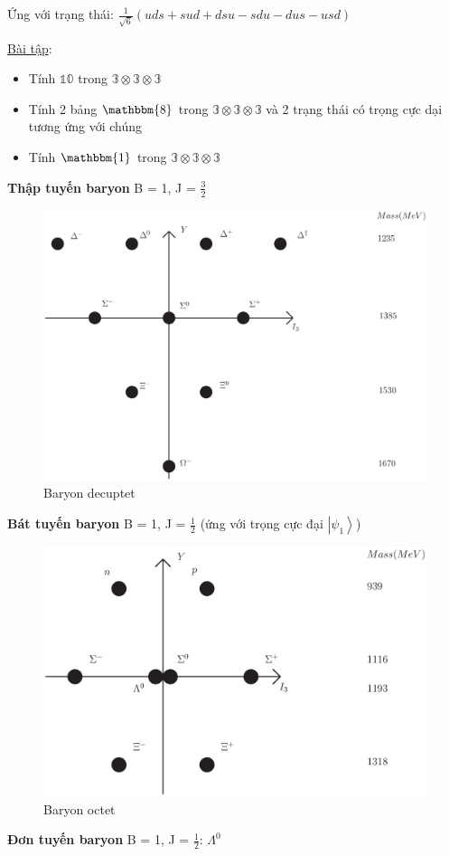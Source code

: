 \documentclass{report}
\begin{document}
Ứng với trạng thái: \(  \frac{1}{\sqrt{6}} \left( uds + sud + dsu - sdu - dus - usd \right) \)

\underline{Bài tập}:

	\begin{itemize}
		\item Tính \( \mathbb{10} \) trong \( \mathbb{3} \otimes \mathbb{3} \otimes \mathbb{3}  \)
		\item Tính 2 bảng \( \mathbbm{8} \) trong \( \mathbb{3} \otimes \mathbb{3} \otimes \mathbb{3}  \) và 2 trạng thái có trọng cực dại tương ứng với chúng
		\item Tính \( \mathbbm{1} \) trong \( \mathbb{3} \otimes \mathbb{3} \otimes \mathbb{3}  \)
	\end{itemize}
	
\textbf{Thập tuyến baryon} B = 1, J = \( \frac{3}{2} \)

	\begin{figure}[!htb]
		\centering
		\includegraphics[scale=0.5]{diagram10.eps}
		\caption{Baryon decuptet}
	\end{figure}
	
\textbf{Bát tuyến baryon} B = 1, J = \( \frac{1}{2} \) (ứng với trọng cực đại \( \left| \psi_{1} \right\rangle \))

	\begin{figure}[!htb]
		\centering
		\includegraphics[scale=0.5]{diagram11.eps}
		\caption{Baryon octet}
	\end{figure}	
	
\textbf{Đơn tuyến baryon} B = 1, J = \( \frac{1}{2} \): \( \Lambda^{0} \)
	
\end{document}
